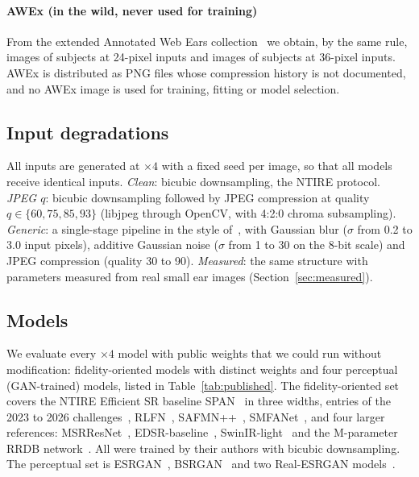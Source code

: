 \paragraph{AWEx (in the wild, never used for training)} From the extended Annotated Web Ears collection~\cite{emersic2017ear,emersic2017uerc} we obtain, by the same rule, \NAwexSImg{} images of \NAwexSSubj{} subjects at 24-pixel inputs and \NAwexMImg{} images of \NAwexMSubj{} subjects at 36-pixel inputs. AWEx is distributed as PNG files whose compression history is not documented, and no AWEx image is used for training, fitting or model selection.

\subsection{Input degradations}
\label{sec:degradations}
All inputs are generated at $\times4$ with a fixed seed per image, so that all models receive identical inputs.
\emph{Clean}: bicubic downsampling, the NTIRE protocol.
\emph{JPEG $q$}: bicubic downsampling followed by JPEG compression at quality $q\in\{60,75,85,93\}$ (libjpeg through OpenCV, with 4:2:0 chroma subsampling).
\emph{Generic}: a single-stage pipeline in the style of~\cite{wang2021realesrgan,zhang2021bsrgan}, with Gaussian blur ($\sigma$ from 0.2 to 3.0 input pixels), additive Gaussian noise ($\sigma$ from 1 to 30 on the 8-bit scale) and JPEG compression (quality 30 to 90).
\emph{Measured}: the same structure with parameters measured from real small ear images (Section~\ref{sec:measured}).

\subsection{Models}
We evaluate every $\times4$ model with public weights that we could run without modification: \NPub{} fidelity-oriented models with distinct weights and four perceptual (GAN-trained) models, listed in Table~\ref{tab:published}. The fidelity-oriented set covers the NTIRE Efficient SR baseline SPAN~\cite{wan2024span} in three widths, entries of the 2023 to 2026 challenges~\cite{ren2024ntire,ren2025ntire,ren2026ntire}, RLFN~\cite{kong2022rlfn}, SAFMN++~\cite{sun2023safmn}, SMFANet~\cite{zheng2024smfanet}, and four larger references: MSRResNet~\cite{ledig2017srgan}, EDSR-baseline~\cite{lim2017edsr}, SwinIR-light~\cite{liang2021swinir} and the \ParamsRrdb{}M-parameter RRDB network~\cite{wang2018esrgan}. All were trained by their authors with bicubic downsampling. The perceptual set is ESRGAN~\cite{wang2018esrgan}, BSRGAN~\cite{zhang2021bsrgan} and two Real-ESRGAN models~\cite{wang2021realesrgan}.

